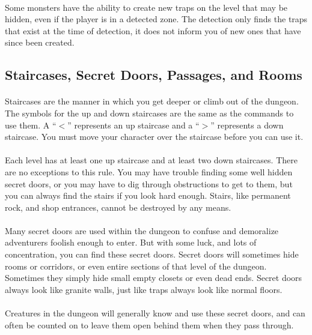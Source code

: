 \paragraph{}Some monsters have the ability to create new traps on the
level that may be hidden, even if the player is in a detected zone. The
detection only finds the traps that exist at the time of detection, it
does not inform you of new ones that have since been created.

\subsection{Staircases, Secret Doors, Passages, and Rooms}
\paragraph{}Staircases are the manner in which you get deeper or climb
out of the dungeon. The symbols for the up and down staircases are the
same as the commands to use them. A ``$<$'' represents an up staircase
and a ``$>$'' represents a down staircase. You must move your character
over the staircase before you can use it.

\paragraph{}Each level has at least one up staircase and at least two
down staircases.  There are no exceptions to this rule. You may have
trouble finding some well hidden secret doors, or you may have to dig
through obstructions to get to them, but you can always find the stairs
if you look hard enough. Stairs, like permanent rock, and shop
entrances, cannot be destroyed by any means.

\paragraph{}Many secret doors are used within the dungeon to confuse and
demoralize adventurers foolish enough to enter. But with some luck, and
lots of concentration, you can find these secret doors. Secret doors
will sometimes hide rooms or corridors, or even entire sections of that
level of the dungeon. Sometimes they simply hide small empty closets or
even dead ends.  Secret doors always look like granite walls, just like
traps always look like normal floors.

\paragraph{}Creatures in the dungeon will generally know and use these
secret doors, and can often be counted on to leave them open behind them
when they pass through.

